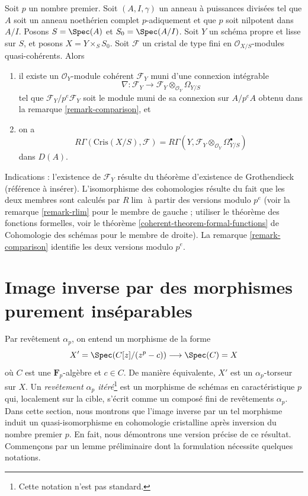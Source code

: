 \begin{remark}
\label{remark-complete-comparison}
Soit $p$ un nombre premier. Soit $(A, I, \gamma)$ un anneau à puissances
divisées tel que $A$ soit un anneau noethérien complet $p$-adiquement et que $p$ soit nilpotent
dans $A/I$. Posons $S = \Spec(A)$ et
$S_0 = \Spec(A/I)$. Soit $Y$ un schéma propre et lisse sur $S$, et posons
$X = Y \times_S S_0$. Soit $\mathcal{F}$ un cristal de type fini en
$\mathcal{O}_{X/S}$-modules quasi-cohérents. Alors
\begin{enumerate}
\item il existe un $\mathcal{O}_Y$-module cohérent $\mathcal{F}_Y$
muni d'une connexion intégrable
$$
\nabla :
\mathcal{F}_Y
\longrightarrow
\mathcal{F}_Y \otimes_{\mathcal{O}_Y} \Omega_{Y/S}
$$
tel que $\mathcal{F}_Y/p^e\mathcal{F}_Y$ soit le module muni de sa connexion
sur $A/p^eA$ obtenu dans la remarque \ref{remark-comparison}, et
\item on a
$$
R\Gamma(\text{Cris}(X/S), \mathcal{F}) =
R\Gamma(Y, \mathcal{F}_Y \otimes_{\mathcal{O}_Y} \Omega^\bullet_{Y/S})
$$
dans $D(A)$.
\end{enumerate}
Indications : l'existence de $\mathcal{F}_Y$ résulte du théorème d'existence de Grothendieck
(référence à insérer). L'isomorphisme des cohomologies résulte
du fait que les deux membres sont calculés par $R\lim$ à partir des versions modulo $p^e$
(voir la remarque \ref{remark-rlim} pour le membre de gauche ; utiliser le théorème
des fonctions formelles, voir le
théorème \ref{coherent-theorem-formal-functions} de Cohomologie des schémas
pour le membre de droite).
La remarque \ref{remark-comparison} identifie les deux versions modulo $p^e$.
\end{remark}





\section{Image inverse par des morphismes purement inséparables}
\label{section-pull-back-along-pth-root}

\noindent
Par revêtement $\alpha_p$, on entend un morphisme de la forme
$$
X' = \Spec(C[z]/(z^p - c)) \longrightarrow \Spec(C) = X
$$
où $C$ est une $\mathbf{F}_p$-algèbre et $c \in C$. De manière équivalente,
$X'$ est un $\alpha_p$-torseur sur $X$. Un {\it revêtement
$\alpha_p$ itéré}\footnote{Cette notation n'est pas standard.}
est un morphisme de schémas en caractéristique
$p$ qui, localement sur la cible, s'écrit comme un composé fini de
revêtements $\alpha_p$. Dans cette section, nous montrons que l'image inverse par
un tel morphisme induit un quasi-isomorphisme en cohomologie cristalline
après inversion du nombre premier $p$. En fait, nous démontrons une version précise
de ce résultat. Commençons par un lemme préliminaire dont la formulation
nécessite quelques notations.

